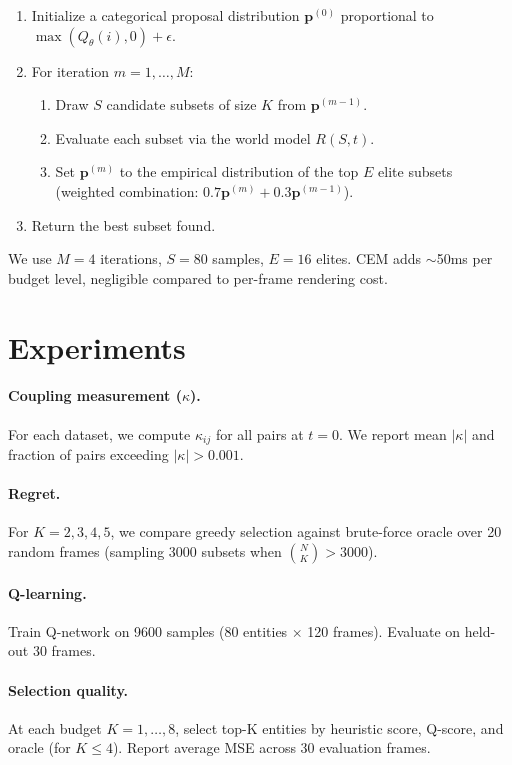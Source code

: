 \documentclass[10pt,twocolumn]{article}
\begin{document}
\begin{enumerate}
    \item Initialize a categorical proposal distribution $\mathbf{p}^{(0)}$ proportional to $\max(Q_\theta(i), 0) + \epsilon$.
    \item For iteration $m = 1,\ldots,M$:
    \begin{enumerate}
        \item Draw $S$ candidate subsets of size $K$ from $\mathbf{p}^{(m-1)}$.
        \item Evaluate each subset via the world model $R(S, t)$.
        \item Set $\mathbf{p}^{(m)}$ to the empirical distribution of the top $E$ elite subsets (weighted combination: $0.7\mathbf{p}^{(m)} + 0.3\mathbf{p}^{(m-1)}$).
    \end{enumerate}
    \item Return the best subset found.
\end{enumerate}

We use $M=4$ iterations, $S=80$ samples, $E=16$ elites. CEM adds $\sim$50ms per budget level, negligible compared to per-frame rendering cost.

\section{Experiments}

\paragraph{Coupling measurement ($\kappa$).}
For each dataset, we compute $\kappa_{ij}$ for all pairs at $t=0$. We report mean $|\kappa|$ and fraction of pairs exceeding $|\kappa| > 0.001$.

\paragraph{Regret.}
For $K = 2,3,4,5$, we compare greedy selection against brute-force oracle over 20 random frames (sampling 3000 subsets when $\binom{N}{K} > 3000$).

\paragraph{Q-learning.}
Train Q-network on 9600 samples (80 entities $\times$ 120 frames). Evaluate on held-out 30 frames.

\paragraph{Selection quality.}
At each budget $K=1,\ldots,8$, select top-K entities by heuristic score, Q-score, and oracle (for $K \leq 4$). Report average MSE across 30 evaluation frames.
\end{document}
